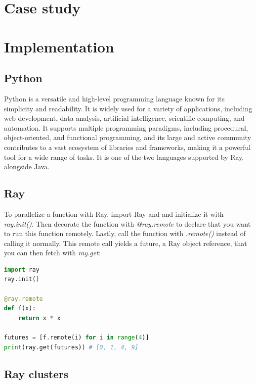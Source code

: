 \pagebreak
\section{Case study}

\section{Implementation}
    \subsection{Python}
    Python is a versatile and high-level programming language known for its simplicity and readability. It is widely used for a variety of applications, including web development, data analysis, artificial intelligence, scientific computing, and automation. It supports multiple programming paradigms, including procedural, object-oriented, and functional programming, and its large and active community contributes to a vast ecosystem of libraries and frameworks, making it a powerful tool for a wide range of tasks. It is one of the two languages supported by Ray, alongside Java.
    
    \subsection{Ray}
    To parallelize a function with Ray, import Ray and and initialize it with \textit{ray.init()}. Then decorate the function with \textit{@ray.remote} to declare that you want to run this function remotely. Lastly, call the function with \textit{.remote()} instead of calling it normally. This remote call yields a future, a Ray object reference, that you can then fetch with \textit{ray.get}:

    \begin{lstlisting}[language=Python]
import ray
ray.init()

@ray.remote
def f(x):
    return x * x

futures = [f.remote(i) for i in range(4)]
print(ray.get(futures)) # [0, 1, 4, 9]
    \end{lstlisting}

\subsection{Ray clusters}

\pagebreak
